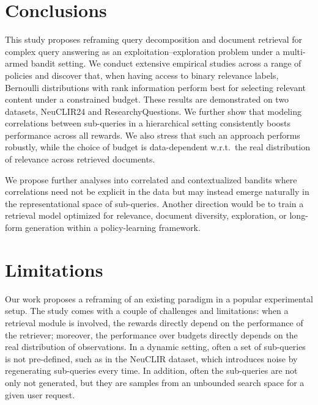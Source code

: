 \section{Conclusions}

This study proposes reframing query decomposition and document retrieval for complex query answering as an exploitation–exploration problem under a multi-armed bandit setting. We conduct extensive empirical studies across a range of policies and discover that, when having access to binary relevance labels, Bernoulli distributions with rank information perform best for selecting relevant content under a constrained budget. These results are demonstrated on two datasets, NeuCLIR24 and ResearchyQuestions. We further show that modeling correlations between sub-queries in a hierarchical setting consistently boosts performance across all rewards. We also stress that such an approach performs robustly, while the choice of budget is data-dependent w.r.t.\ the real distribution of relevance across retrieved documents.

We propose further analyses into correlated and contextualized bandits where correlations need not be explicit in the data but may instead emerge naturally in the representational space of sub-queries. Another direction would be to train a retrieval model optimized for relevance, document diversity, exploration, or long-form generation within a policy-learning framework.

\clearpage
\section*{Limitations}
Our work proposes a reframing of an existing paradigm in a popular experimental setup. The study comes with a couple of challenges and limitations: when a retrieval module is involved, the rewards directly depend on the performance of the retriever; moreover, the performance over budgets directly depends on the real distribution of observations. In a dynamic setting, often a set of sub-queries is not pre-defined, such as in the NeuCLIR dataset, which introduces noise by regenerating sub-queries every time. In addition, often the sub-queries are not only not generated, but they are samples from an unbounded search space for a given user request.